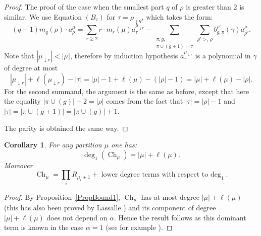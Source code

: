 \documentclass[11pt]{amsart}
\theoremstyle{plain}
\newtheorem{corollary}[lemma]{Corollary}
\theoremstyle{remark}
\DeclareMathOperator{\Ch}{Ch}
\begin{document}
\begin{proof}
    The proof of the case when the smallest part $q$ of $\rho$ is greater than $2$ is similar.
    We use Equation $(B_\tau)$ for $\tau=\rho_{\downarrow q}$, which takes the form:
    \[ (q-1) m_q(\rho) \cdot a^\mu_\rho = \sum_{r\geq 2} r \cdot m_r(\mu) a^{\mu_{\downarrow r}}_{\tau} 
    - \sum_{\substack{\pi,g, \\ \pi \cup (g+1) = \tau}} \sum_{\rho' >_1 \rho}
    b_{g,\pi}^{\rho'}(\gamma) a^\mu_{\rho'}.\]
    Note that $|\mu_{\downarrow r}|<|\mu|$, therefore by induction hypothesis
    $a^{\mu_{\downarrow r}}_{\tau}$ is a polynomial in $\gamma$ of degree at most
    \[|\mu_{\downarrow r}| + \ell(\mu_{\downarrow r}) -|\tau|=|\mu|-1+\ell(\mu)-(|\rho|-1)
    = |\mu|+\ell(\mu) - |\rho|.\]
    For the second summand, the argument is the same as before, except that here
    the equality $|\pi \cup (g)|+2=|\rho|$ comes from the fact that $|\tau|=|\rho|-1$
    and $|\tau|=|\pi \cup (g+1)|= |\pi \cup (g)|+1$.

    The parity is obtained the same way.
\end{proof}

\begin{corollary}
    \label{corol:dominant_deg1}
For any partition $\mu$ one has:
\[ \deg_1(\Ch_\mu) = |\mu| + \ell(\mu).\]
Moreover
\[ \Ch_\mu = \prod_{i}R_{\mu_i+1} + \text{lower degree terms with respect to $\deg_1$}. \]
\end{corollary}

\begin{proof}
    By Proposition~\ref{PropBound1}, $\Ch_\mu$ has at most degree $|\mu|+\ell(\mu)$
(this has also been proved by Lassalle
\cite[Proposition 9.2 (ii)]{Lassalle2009})
and its component of degree $|\mu|+\ell(\mu)$ does not depend on $\alpha$.
Hence the result follows as this dominant term is known in the case $\alpha=1$
(see for example \cite[Theorem 4.9]{SniadyGenusExpansion}).
\end{proof}
\end{document}
